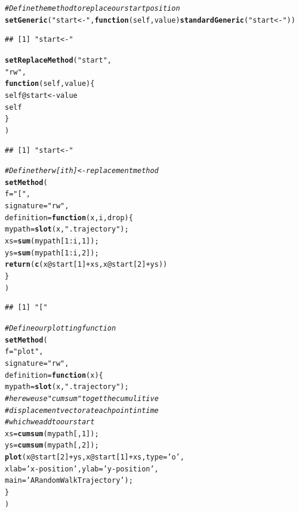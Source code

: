 \documentclass{article}\usepackage[]{graphicx}\usepackage[]{color}
\makeatletter
\newcommand{\hlnum}[1]{\textcolor[rgb]{0.686,0.059,0.569}{#1}}%
\newcommand{\hlstr}[1]{\textcolor[rgb]{0.192,0.494,0.8}{#1}}%
\newcommand{\hlcom}[1]{\textcolor[rgb]{0.678,0.584,0.686}{\textit{#1}}}%
\newcommand{\hlopt}[1]{\textcolor[rgb]{0,0,0}{#1}}%
\newcommand{\hlstd}[1]{\textcolor[rgb]{0.345,0.345,0.345}{#1}}%
\newcommand{\hlkwa}[1]{\textcolor[rgb]{0.161,0.373,0.58}{\textbf{#1}}}%
\newcommand{\hlkwb}[1]{\textcolor[rgb]{0.69,0.353,0.396}{#1}}%
\newcommand{\hlkwc}[1]{\textcolor[rgb]{0.333,0.667,0.333}{#1}}%
\newcommand{\hlkwd}[1]{\textcolor[rgb]{0.737,0.353,0.396}{\textbf{#1}}}%
\newenvironment{kframe}{%
 \def\at@end@of@kframe{}%
 \ifinner\ifhmode%
  \def\at@end@of@kframe{\end{minipage}}%
  \begin{minipage}{\columnwidth}%
 \fi\fi%
 \def\FrameCommand##1{\hskip\@totalleftmargin \hskip-\fboxsep
 \colorbox{shadecolor}{##1}\hskip-\fboxsep
     \hskip-\linewidth \hskip-\@totalleftmargin \hskip\columnwidth}%
 \MakeFramed {\advance\hsize-\width
   \@totalleftmargin\z@ \linewidth\hsize
   \@setminipage}}%
 {\par\unskip\endMakeFramed%
 \at@end@of@kframe}
\newenvironment{knitrout}{}{} %
\makeatother
\begin{document}
\begin{knitrout}
\begin{kframe}
\begin{alltt}
\hlcom{# Define the method to replace our start position}
\hlkwd{setGeneric}\hlstd{(}\hlstr{"start<-"}\hlstd{,} \hlkwa{function}\hlstd{(}\hlkwc{self}\hlstd{,} \hlkwc{value}\hlstd{)} \hlkwd{standardGeneric}\hlstd{(}\hlstr{"start<-"}\hlstd{))}
\end{alltt}
\begin{verbatim}
## [1] "start<-"
\end{verbatim}
\begin{alltt}
\hlkwd{setReplaceMethod}\hlstd{(}\hlstr{"start"}\hlstd{,}
  \hlstr{"rw"}\hlstd{,}
  \hlkwa{function}\hlstd{(}\hlkwc{self}\hlstd{,}\hlkwc{value}\hlstd{) \{}
  \hlstd{self}\hlopt{@}\hlkwc{start} \hlkwb{<-} \hlstd{value}
  \hlstd{self}
  \hlstd{\}}
\hlstd{)}
\end{alltt}
\begin{verbatim}
## [1] "start<-"
\end{verbatim}
\begin{alltt}
\hlcom{# Define the rw[i th] <- replacement method}
\hlkwd{setMethod}\hlstd{(}
  \hlkwc{f}\hlstd{=}\hlstr{"["}\hlstd{,}
  \hlkwc{signature}\hlstd{=}\hlstr{"rw"}\hlstd{,}
  \hlkwc{definition}\hlstd{=}\hlkwa{function}\hlstd{(}\hlkwc{x}\hlstd{,}\hlkwc{i}\hlstd{,}\hlkwc{drop}\hlstd{)\{}
    \hlstd{mypath}\hlkwb{=}\hlkwd{slot}\hlstd{(x,}\hlstr{".trajectory"}\hlstd{);}
    \hlstd{xs}\hlkwb{=}\hlkwd{sum}\hlstd{(mypath[}\hlnum{1}\hlopt{:}\hlstd{i,}\hlnum{1}\hlstd{]);}
    \hlstd{ys}\hlkwb{=}\hlkwd{sum}\hlstd{(mypath[}\hlnum{1}\hlopt{:}\hlstd{i,}\hlnum{2}\hlstd{]);}
    \hlkwd{return}\hlstd{(}\hlkwd{c}\hlstd{(x}\hlopt{@}\hlkwc{start}\hlstd{[}\hlnum{1}\hlstd{]}\hlopt{+}\hlstd{xs, x}\hlopt{@}\hlkwc{start}\hlstd{[}\hlnum{2}\hlstd{]}\hlopt{+}\hlstd{ys))}
  \hlstd{\}}
\hlstd{)}
\end{alltt}
\begin{verbatim}
## [1] "["
\end{verbatim}
\begin{alltt}
\hlcom{# Define our plotting function}
\hlkwd{setMethod}\hlstd{(}
  \hlkwc{f}\hlstd{=}\hlstr{"plot"}\hlstd{,}
  \hlkwc{signature}\hlstd{=}\hlstr{"rw"}\hlstd{,}
  \hlkwc{definition}\hlstd{=}\hlkwa{function}\hlstd{(}\hlkwc{x}\hlstd{)\{}
    \hlstd{mypath}\hlkwb{=}\hlkwd{slot}\hlstd{(x,}\hlstr{".trajectory"}\hlstd{);}
    \hlcom{# here we use "cumsum" to get the cumulitive}
    \hlcom{# displacement vector at each point in time}
    \hlcom{# which we add to our start}
    \hlstd{xs}\hlkwb{=}\hlkwd{cumsum}\hlstd{(mypath[,}\hlnum{1}\hlstd{]);}
    \hlstd{ys}\hlkwb{=}\hlkwd{cumsum}\hlstd{(mypath[,}\hlnum{2}\hlstd{]);}
    \hlkwd{plot}\hlstd{(x}\hlopt{@}\hlkwc{start}\hlstd{[}\hlnum{2}\hlstd{]}\hlopt{+}\hlstd{ys,x}\hlopt{@}\hlkwc{start}\hlstd{[}\hlnum{1}\hlstd{]}\hlopt{+}\hlstd{xs,} \hlkwc{type}\hlstd{=}\hlstr{'o'}\hlstd{,}
         \hlkwc{xlab}\hlstd{=}\hlstr{'x-position'}\hlstd{,} \hlkwc{ylab}\hlstd{=}\hlstr{'y-position'}\hlstd{,}
         \hlkwc{main}\hlstd{=}\hlstr{'A Random Walk Trajectory'}\hlstd{);}
  \hlstd{\}}
\hlstd{)}
\end{alltt}



\end{kframe}
\end{knitrout}
\end{document}
